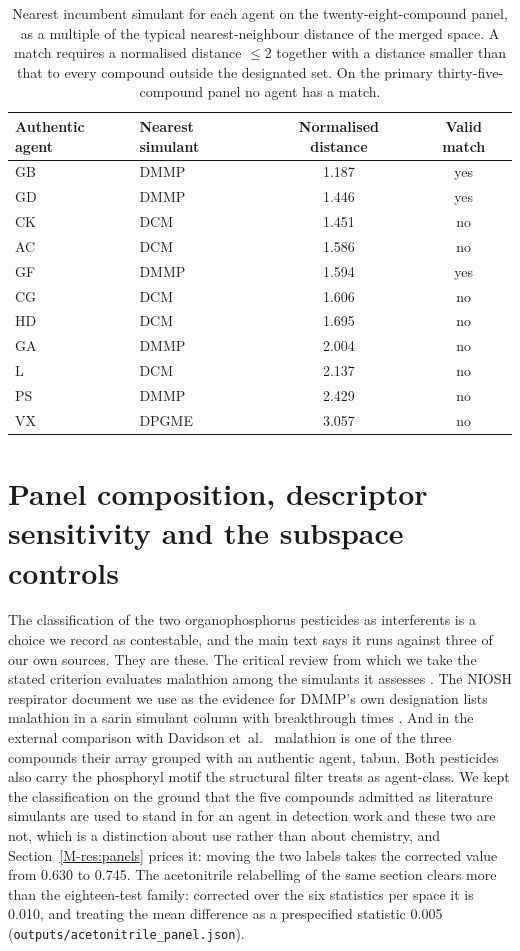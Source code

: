 \documentclass[11pt,a4paper]{article}
\begin{document}
\begin{table}[!htb]
\centering
\caption{Nearest incumbent simulant for each agent on the twenty-eight-compound
panel, as a multiple of the typical nearest-neighbour distance of the merged
space. A match requires a normalised distance $\le 2$ together with a distance
smaller than that to every compound outside the designated set. On the primary
thirty-five-compound panel no agent has a match.}
\label{tab:match}
\small
\begin{tabular}{llcc}
\hline
Authentic agent & Nearest simulant & Normalised distance & Valid match \\
\hline
GB & DMMP & 1.187 & yes \\
GD & DMMP & 1.446 & yes \\
CK & DCM & 1.451 & no \\
AC & DCM & 1.586 & no \\
GF & DMMP & 1.594 & yes \\
CG & DCM & 1.606 & no \\
HD & DCM & 1.695 & no \\
GA & DMMP & 2.004 & no \\
L & DCM & 2.137 & no \\
PS & DMMP & 2.429 & no \\
VX & DPGME & 3.057 & no \\
\hline
\end{tabular}
\end{table}

\section{Panel composition, descriptor sensitivity and the subspace controls}
\label{meth:panelsi}

The classification of the two organophosphorus pesticides as interferents is a
choice we record as contestable, and the main text says it runs against three of
our own sources. They are these. The critical review from which we take the
stated criterion evaluates malathion among the simulants it assesses
\cite{webb2025}. The NIOSH respirator document we use as the evidence for DMMP's
own designation lists malathion in a sarin simulant column with breakthrough
times \cite{niosh2002simulant}. And in the external comparison with Davidson
et~al.\ \cite{davidson2020} malathion is one of the three compounds their array
grouped with an authentic agent, tabun. Both pesticides also carry the
phosphoryl motif the structural filter treats as agent-class. We kept the
classification on the ground that the five compounds admitted as literature
simulants are used to stand in for an agent in detection work and these two are
not, which is a distinction about use rather than about chemistry, and
Section~\ref{M-res:panels} prices it: moving the two labels takes the corrected
value from 0.630 to 0.745. The acetonitrile relabelling of the same section
clears more than the eighteen-test family: corrected over the six statistics
per space it is 0.010, and treating the mean difference as a prespecified
statistic 0.005 (\texttt{outputs/acetonitrile\_panel.json}).
\end{document}
